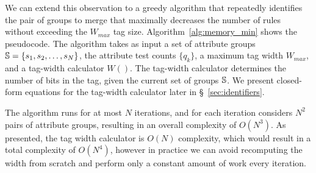 We can extend this observation to a greedy algorithm that repeatedly
identifies the pair of groups to merge that maximally decreases the
number of rules without exceeding the $W_{max}$ tag size.
Algorithm~\ref{alg:memory_min} shows the pseudocode.  The algorithm
takes as input a set of attribute groups $\mathbb{S} = \{s_1, s_2, \dots,
s_N\}$, the attribute test counts $\{q_k\}$, a maximum tag width
$W_{max}$, and a tag-width calculator $W()$.  The tag-width calculator
determines the number of bits in the tag, given the current set of
groups $\mathbb{S}$.  We present closed-form equations for the tag-width
calculator later in \S~\ref{sec:identifiers}.

The algorithm runs for at most $N$ iterations, and for each iteration considers $N^2$ pairs of attribute groups, resulting in an overall complexity of $O(N^3)$. As presented, the tag width calculator is $O(N)$ complexity, which would result in a total complexity of $O(N^4)$, however in practice we can avoid recomputing the width from scratch and perform only a constant amount of work every iteration. 

